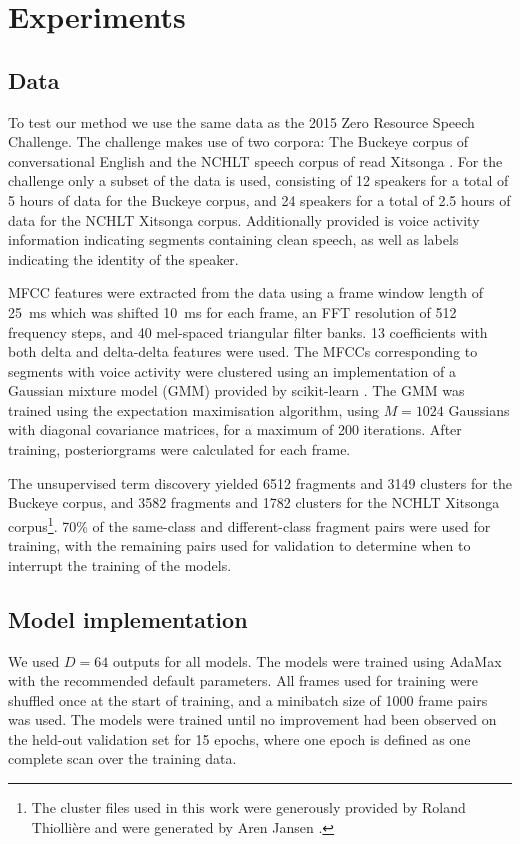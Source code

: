 \section{Experiments}
\label{sec:experiments}

\subsection{Data}
\label{sec:data}

To test our method we use the same data as the 2015 Zero Resource Speech Challenge.
The challenge makes use of two corpora: The Buckeye corpus of conversational English \parencite{buckeyecorpus} and the NCHLT speech corpus of read Xitsonga \parencite{barnard2014nchlt}.
For the challenge only a subset of the data is used, consisting of 12 speakers for a total of 5 hours of data for the Buckeye corpus, and 24 speakers for a total of 2.5 hours of data for the NCHLT Xitsonga corpus.
Additionally provided is voice activity information indicating segments containing clean speech, as well as labels indicating the identity of the speaker.

MFCC features were extracted from the data using a frame window length of \SI{25}{\ms} which was shifted \SI{10}{\ms} for each frame, an FFT resolution of 512 frequency steps, and 40 mel-spaced triangular filter banks.
13 coefficients with both delta and delta-delta features were used.
The MFCCs corresponding to segments with voice activity were clustered using an implementation of a Gaussian mixture model (GMM) provided by scikit-learn \parencite{scikit-learn}.
The GMM was trained using the expectation maximisation algorithm, using $M = 1024$ Gaussians with diagonal covariance matrices, for a maximum of 200 iterations.
After training, posteriorgrams were calculated for each frame.

The unsupervised term discovery yielded 6512 fragments and 3149 clusters for the Buckeye corpus, and 3582 fragments and 1782 clusters for the NCHLT Xitsonga corpus\footnote{The cluster files used in this work were generously provided by Roland Thiollière \parencite{thiolliere2015hybrid} and were generated by Aren Jansen \parencite{jansen2011efficient}.}.
70\% of the same-class and different-class fragment pairs were used for training, with the remaining pairs used for validation to determine when to interrupt the training of the models.

\subsection{Model implementation}
We used $D = 64$ outputs for all models.
The models were trained using AdaMax \parencite{kingma2014adam} with the recommended default parameters.
All frames used for training were shuffled once at the start of training, and a minibatch size of 1000 frame pairs was used.
The models were trained until no improvement had been observed on the held-out validation set for 15 epochs, where one epoch is defined as one complete scan over the training data.

